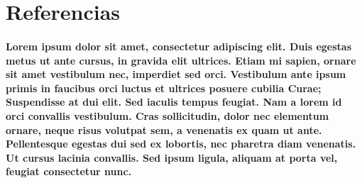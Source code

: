 \documentclass[10pt, twocolumn]{article}
\begin{document}
\section*{Referencias}
\paragraph{Lorem ipsum dolor sit amet, consectetur adipiscing elit. Duis egestas metus ut ante cursus, in gravida elit ultrices. Etiam mi sapien, ornare sit amet vestibulum nec, imperdiet sed orci. Vestibulum ante ipsum primis in faucibus orci luctus et ultrices posuere cubilia Curae; Suspendisse at dui elit. Sed iaculis tempus feugiat. Nam a lorem id orci convallis vestibulum. Cras sollicitudin, dolor nec elementum ornare, neque risus volutpat sem, a venenatis ex quam ut ante. Pellentesque egestas dui sed ex lobortis, nec pharetra diam venenatis. Ut cursus lacinia convallis. Sed ipsum ligula, aliquam at porta vel, feugiat consectetur nunc.}
\end{document}
